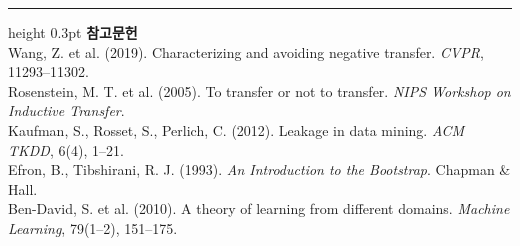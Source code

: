 \documentclass[10pt]{article}
\begin{document}
\vspace{0.6em}
\hrule height 0.3pt
\vspace{0.5em}
{\footnotesize
\textbf{참고문헌}\\[0.3em]
Wang, Z. et al. (2019). Characterizing and avoiding negative transfer.
\emph{CVPR}, 11293--11302.\\[0.15em]
Rosenstein, M. T. et al. (2005). To transfer or not to transfer.
\emph{NIPS Workshop on Inductive Transfer}.\\[0.15em]
Kaufman, S., Rosset, S., Perlich, C. (2012). Leakage in data mining.
\emph{ACM TKDD}, 6(4), 1--21.\\[0.15em]
Efron, B., Tibshirani, R. J. (1993). \emph{An Introduction to the Bootstrap}.
Chapman \& Hall.\\[0.15em]
Ben-David, S. et al. (2010). A theory of learning from different domains.
\emph{Machine Learning}, 79(1--2), 151--175.
}
\end{document}
